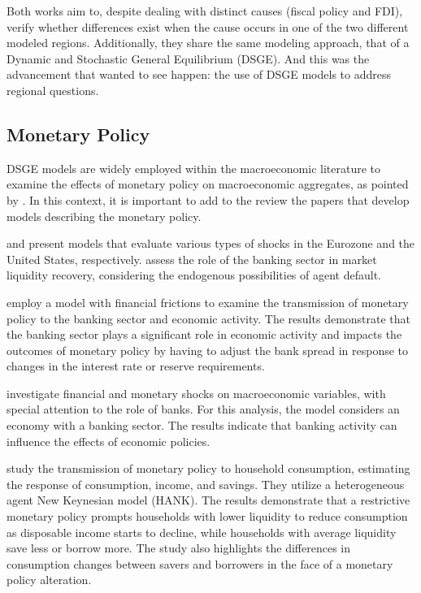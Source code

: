 \documentclass[../thesis.tex]{subfiles}
\begin{document}
Both works aim to, despite dealing with distinct causes (fiscal policy and FDI), verify whether differences exist when the cause occurs in one of the two different modeled regions. Additionally, they share the same modeling approach, that of a Dynamic and Stochastic General Equilibrium (DSGE). And this was the advancement that \textcite{rickman_modern_2010} wanted to see happen: the use of DSGE models to address regional questions.

\subsection*{Monetary Policy}

DSGE models are widely employed within the macroeconomic literature to examine the effects of monetary policy on macroeconomic aggregates, as pointed by \textcite{gali_monetary_2015}. In this context, it is important to add to the review the papers that develop models describing the monetary policy.

\textcite{smets_estimated_2003} and \textcite{smets_shocks_2007} present models that evaluate various types of shocks in the Eurozone and the United States, respectively. \textcite{walque_financial_2010} assess the role of the banking sector in market liquidity recovery, considering the endogenous possibilities of agent default.

\textcite{vinhado_politica_2016} employ a model with financial frictions to examine the transmission of monetary policy to the banking sector and economic activity. The results demonstrate that the banking sector plays a significant role in economic activity and impacts the outcomes of monetary policy by having to adjust the bank spread in response to changes in the interest rate or reserve requirements.

\textcite{soltani_investigating_2021} investigate financial and monetary shocks on macroeconomic variables, with special attention to the role of banks. For this analysis, the model considers an economy with a banking sector. The results indicate that banking activity can influence the effects of economic policies.

\textcite{holm_transmission_2021} study the transmission of monetary policy to household consumption, estimating the response of consumption, income, and savings. They utilize a heterogeneous agent New Keynesian model (HANK). The results demonstrate that a restrictive monetary policy prompts households with lower liquidity to reduce consumption as disposable income starts to decline, while households with average liquidity save less or borrow more. The study also highlights the differences in consumption changes between savers and borrowers in the face of a monetary policy alteration.
\end{document}
